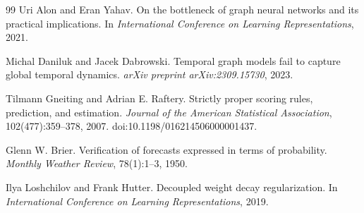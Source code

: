 \begin{thebibliography}{99}
Uri Alon and Eran Yahav.
\newblock On the bottleneck of graph neural networks and its practical implications.
\newblock In \emph{International Conference on Learning Representations}, 2021.

Michal Daniluk and Jacek Dabrowski.
\newblock Temporal graph models fail to capture global temporal dynamics.
\newblock \emph{arXiv preprint arXiv:2309.15730}, 2023.

Tilmann Gneiting and Adrian E. Raftery.
\newblock Strictly proper scoring rules, prediction, and estimation.
\newblock \emph{Journal of the American Statistical Association}, 102(477):359--378, 2007.
\newblock doi:10.1198/016214506000001437.

Glenn W. Brier.
\newblock Verification of forecasts expressed in terms of probability.
\newblock \emph{Monthly Weather Review}, 78(1):1--3, 1950.

Ilya Loshchilov and Frank Hutter.
\newblock Decoupled weight decay regularization.
\newblock In \emph{International Conference on Learning Representations}, 2019.

\end{thebibliography}
